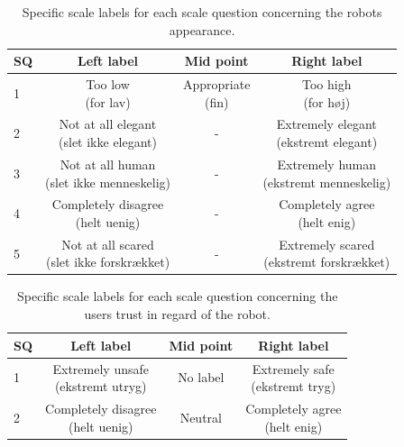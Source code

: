 \begin{table}[H]
	\centering
\caption{Specific scale labels for each scale question concerning the robots appearance.}
	\label{tab:AppearanceScale} 
	\begin{tabular}{l|c|c|c}
		SQ     & Left label & Mid point & Right label \\\hline
		1   & \makecell{Too low \\(for lav)}  & \makecell{Appropriate \\(fin)} & \makecell{Too high \\(for høj)}        \\\hline
		2   & \makecell{Not at all elegant \\(slet ikke elegant)} & - & \makecell{Extremely elegant \\(ekstremt elegant)}         \\\hline
		3   & \makecell{Not at all human \\(slet ikke menneskelig)} & - & \makecell{Extremely human \\(ekstremt menneskelig)}         \\\hline
	 	4   & \makecell{Completely disagree \\(helt uenig)} & - & \makecell{Completely agree \\(helt enig)}         \\\hline
		5   & \makecell{Not at all scared \\(slet ikke forskrækket)} & -  & \makecell{Extremely scared \\(ekstremt forskrækket)}           
	\end{tabular}        
\end{table}
\noindent
%
%
\begin{table}[H]
	\centering
\caption{Specific scale labels for each scale question concerning the users trust in regard of the robot.}
	\label{tab:TrustScale} 
	\begin{tabular}{l|c|c|c}
		SQ  & Left label & Mid point & Right label \\\hline
		1   & \makecell{Extremely unsafe\\ (ekstremt utryg)} & No label & \makecell{Extremely safe \\(ekstremt tryg)}          \\\hline
		2   & \makecell{Completely disagree \\(helt uenig)} & Neutral &\makecell{Completely agree \\(helt enig)} 
	\end{tabular}        
\end{table}
